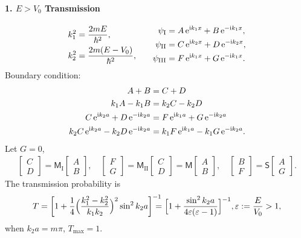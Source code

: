 \documentclass{article}
\newcommand*{\op}[1]{\mathsf{#1}}
\newcommand{\ko}[1]{\hspace{-#1 pt}}
\begin{document}
\paragraph{1. $E>V_0$ Transmission}
\begin{align*}
	\begin{aligned}
		k_1^2 & =\frac{2mE}{\hbar^2},       \\
		k_2^2 & =\frac{2m(E-V_0)}{\hbar^2},
	\end{aligned}\qquad
	\begin{aligned}
		\psi_{\mathrm{I}}   & =A\mathop{}\!\mathrm{e}^{\mathrm{i} k_1x}+B\mathop{}\!\mathrm{e}^{-\mathrm{i} k_1x}, \\
		\psi_{\mathrm{II}}  & =C\mathop{}\!\mathrm{e}^{\mathrm{i} k_2x}+D\mathop{}\!\mathrm{e}^{-\mathrm{i} k_2x}, \\
		\psi_{\mathrm{III}} & =F\mathop{}\!\mathrm{e}^{\mathrm{i} k_1x}+G\mathop{}\!\mathrm{e}^{-\mathrm{i} k_1x}.
	\end{aligned}
\end{align*}
Boundary condition:
\begin{align*}
	A+B                          & =C+D                           \\
	k_1A-k_1B                    & =k_2C-k_2D                     \\
	C\e^{\i k_2a}+D\e^{-\i k_2a}       & =F\e^{\i k_1a}+G\e^{-\i k_2a}        \\
	k_2C\e^{\i k_2a}-k_2D\e^{-\i k_2a} & =k_1F\e^{\i k_1a}-k_1G\e^{-\i k_2a}.
\end{align*}
Let $G=0$,
\begin{align*}
	\begin{bmatrix}C\\D\end{bmatrix}=\op{M}_{\mathrm{I}}
	\begin{bmatrix}A\\B\end{bmatrix},\quad
	\begin{bmatrix}F\\G\end{bmatrix}=\op{M}_{\mathrm{II}}
	\begin{bmatrix}C\\D\end{bmatrix}=\op{M}
	\begin{bmatrix}A\\B\end{bmatrix},\quad
	\begin{bmatrix}B\\F\end{bmatrix}=\op{S}
	\begin{bmatrix}A\\G\end{bmatrix}.
\end{align*}
The transmission probability is
$$T=\biggl[1+\frac14\Bigl(\frac{k_1^2-k_2^2}{k_1k_2}\Bigr)^2\sin^2k_2a\biggr]^{-1}\ko{10}=\Bigl[1+\frac{\sin^2k_2a}{4\varepsilon(\varepsilon-1)}\Bigr]^{-1},\varepsilon:=\frac E{V_0}>1,$$
when $k_2a=m\pi$, $T_{\max}=1$.
\end{document}
